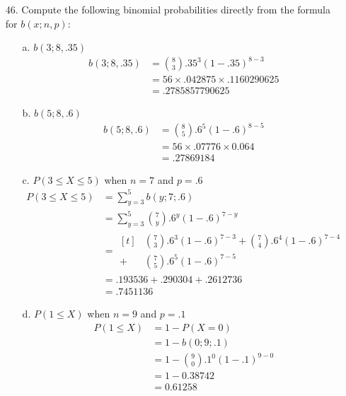 \documentclass[letterpaper,12pt]{article}
\newcommand{\bp}[3]{%
  \binom{#2}{#1}#3^#1(1 - #3)^{#2 - #1}%
}
\begin{document}
\maketitle

\begin{enumerate}
  \item[46.]
    Compute the following binomial probabilities directly from the formula for $b(x; n, p)$:
    \begin{enumerate}
      \item[a.]
        $b(3; 8, .35)$
        \begin{align*}
          b(3; 8, .35) &= \bp{3}{8}{.35} \\
          &= 56 \times .042875 \times .1160290625 \\
          &= .2785857790625
        \end{align*}
      \item[b.]
        $b(5; 8, .6)$
        \begin{align*}
          b(5; 8, .6) &= \bp{5}{8}{.6}  \\
          &= 56 \times .07776 \times 0.064 \\
          &= .27869184
        \end{align*}
      \item[c.]
        $P(3 \le X \le 5)$ when $n = 7$ and $p = .6$
        \begin{align*}
          P(3 \le X \le 5) &= \sum_{y = 3}^5 b(y; 7; .6) \\
          &= \sum_{y = 3}^5 \bp{y}{7}{.6}  \\
          &= \begin{aligned}[t]
            &\bp{3}{7}{.6} + \bp{4}{7}{.6}  \\
            + &\bp{5}{7}{.6}
          \end{aligned} \\
          &= .193536 + .290304 + .2612736 \\
          &= .7451136
        \end{align*}
      \item[d.]
        $P(1 \le X)$ when $n = 9$ and $p = .1$
        \begin{align*}
          P(1 \le X) &= 1 - P(X = 0) \\
          &= 1 - b(0; 9; .1) \\
          &= 1 - \bp{0}{9}{.1} \\
          &= 1 - 0.38742 \\
          &= 0.61258
        \end{align*}

\end{enumerate}
\end{enumerate}
\end{document}

